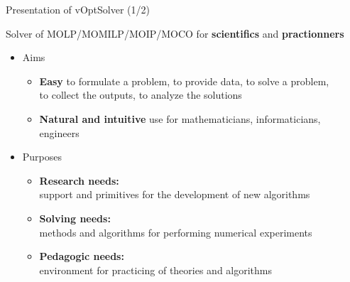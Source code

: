 \documentclass[10pt,xcolor=dvipsnames]{beamer}
\newcommand{\blue}{\textcolor{blue}}
\begin{document}
\begin{frame}{Presentation of vOptSolver (1/2)}

\hspace{-5mm}Solver of MOLP/MOMILP/MOIP/MOCO for \textbf{scientifics} and \textbf{practionners}

\begin{itemize}
\item Aims

\begin{itemize}
    \item \textbf{Easy} to formulate a problem, to provide data, to solve a problem, \\ to collect the outputs, to analyze the solutions
    \item \textbf{Natural and intuitive} use for {mathematicians, informaticians, engineers}
\end{itemize}
\medskip

\item Purposes

\begin{itemize}
    \item \textbf{Research needs:}\\ support and primitives for the development of new algorithms
    \item \textbf{Solving needs:}\\ methods and algorithms for performing numerical experiments
    \item \textbf{Pedagogic needs:}\\ environment for practicing of theories and algorithms
\end{itemize}

%
%
%

\end{itemize}

\end{frame}
\end{document}
